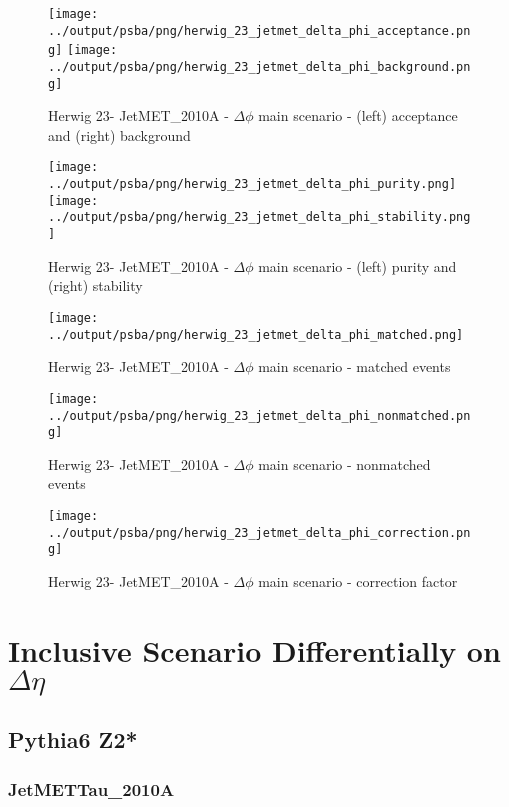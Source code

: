 \documentclass[11pt]{book}
\begin{document}
\begin{figure}[ht]
\centering
\texttt{[image: ../output/psba/png/herwig\_23\_jetmet\_delta\_phi\_acceptance.png]}
\texttt{[image: ../output/psba/png/herwig\_23\_jetmet\_delta\_phi\_background.png]}
\caption{Herwig 23- JetMET\_2010A - $\Delta\phi$ main scenario - (left) acceptance and (right) background}
\label{fig:hw_23_jetmet_delta_phi_ab}
\end{figure}

\begin{figure}[ht]
\centering
\texttt{[image: ../output/psba/png/herwig\_23\_jetmet\_delta\_phi\_purity.png]}
\texttt{[image: ../output/psba/png/herwig\_23\_jetmet\_delta\_phi\_stability.png]}
\caption{Herwig 23- JetMET\_2010A - $\Delta\phi$ main scenario - (left) purity and (right) stability}
\label{fig:hw_23_jetmet_delta_phi_ps}
\end{figure}

\begin{figure}[ht]
\centering
\texttt{[image: ../output/psba/png/herwig\_23\_jetmet\_delta\_phi\_matched.png]}
\caption{Herwig 23- JetMET\_2010A - $\Delta\phi$ main scenario - matched events}
\label{fig:hw_23_jetmet_delta_phi_matched}
\end{figure}

\begin{figure}[ht]
\centering
\texttt{[image: ../output/psba/png/herwig\_23\_jetmet\_delta\_phi\_nonmatched.png]}
\caption{Herwig 23- JetMET\_2010A - $\Delta\phi$ main scenario - nonmatched events}
\label{fig:hw_23_jetmet_delta_phi_nonmatched}
\end{figure}

\begin{figure}[ht]
\centering
\texttt{[image: ../output/psba/png/herwig\_23\_jetmet\_delta\_phi\_correction.png]}
\caption{Herwig 23- JetMET\_2010A - $\Delta\phi$ main scenario - correction factor}
\label{fig:hw_23_jetmet_delta_phi_correction}
\end{figure}


\clearpage
\chapter{Inclusive Scenario Differentially on $\Delta\eta$}
\section{Pythia6 Z2*}
\subsection{JetMETTau\_2010A}
\end{document}
